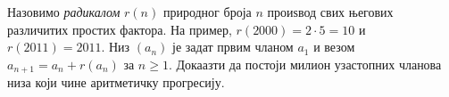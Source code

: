 Назовимо \emph{радикалом} $r(n)$ природног броја $n$ проиѕвод свих његових
различитих простих фактора.
На пример, $r(2000) = 2 \cdot 5 = 10$ и $r(2011) = 2011$.
Низ $(a_n)$ је задат првим чланом $a_1$ и везом $a_{n + 1} = a_n + r(a_n)$ за
$n \geq 1$.
Докаазти да постоји милион узастопних чланова низа који чине аритметичку
прогресију.

\solution

